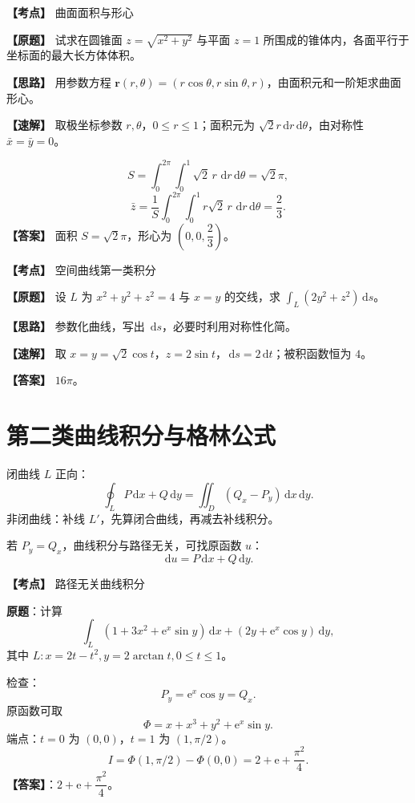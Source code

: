 ﻿\documentclass[11pt,a4paper,UTF8]{ctexart}
\newcommand{\dd}{\,\mathrm d}
\newcommand{\ee}{\mathrm e}
\begin{document}
\begin{answerbox}[2021--2022 四-13]
\textbf{【考点】} 曲面面积与形心

\textbf{【原题】} 试求在圆锥面 $z=\sqrt{x^2+y^2}$ 与平面 $z=1$ 所围成的锥体内，各面平行于坐标面的最大长方体体积。

\textbf{【思路】} 用参数方程 $\boldsymbol r(r,\theta)=(r\cos\theta,r\sin\theta,r)$，由面积元和一阶矩求曲面形心。

\textbf{【速解】} 取极坐标参数 $r,\theta$，$0\le r\le1$；面积元为 $\sqrt2r\dd r\dd\theta$，由对称性 $\bar x=\bar y=0$。

\[
S=\int_0^{2\pi}\int_0^1\sqrt2\,r\,\dd r\dd\theta=\sqrt2\pi,
\]
\[
\bar z=\frac{1}{S}\int_0^{2\pi}\int_0^1 r\sqrt2\,r\,\dd r\dd\theta=\frac23.
\]
\textbf{【答案】} 面积 $S=\sqrt2\pi$，形心为 $\left(0,0,\dfrac23\right)$。
\end{answerbox}

\begin{answerbox}[2021--2022 一-3]
\textbf{【考点】} 空间曲线第一类积分

\textbf{【原题】} 设 $L$ 为 $x^2+y^2+z^2=4$ 与 $x=y$ 的交线，求 $\displaystyle \int_L(2y^2+z^2)\dd s$。

\textbf{【思路】} 参数化曲线，写出 $\dd s$，必要时利用对称性化简。

\textbf{【速解】} 取 $x=y=\sqrt2\cos t$，$z=2\sin t$，$\dd s=2\dd t$；被积函数恒为 $4$。

\textbf{【答案】} $16\pi$。
\end{answerbox}
\section{第二类曲线积分与格林公式}

\begin{templatebox}[格林公式模板]
闭曲线 $L$ 正向：
\[
\oint_LP\dd x+Q\dd y=\iint_D\left(Q_x-P_y\right)\dd x\dd y.
\]
非闭曲线：补线 $L'$，先算闭合曲线，再减去补线积分。

若 $P_y=Q_x$，曲线积分与路径无关，可找原函数 $u$：
\[
\dd u=P\dd x+Q\dd y.
\]
\end{templatebox}

\begin{answerbox}[2020--2021 二-8]
\textbf{【考点】} 路径无关曲线积分

\textbf{原题}：计算
\[
\int_L(1+3x^2+\ee^x\sin y)\dd x+(2y+\ee^x\cos y)\dd y,
\]
其中 $L:x=2t-t^2,y=2\arctan t,0\le t\le1$。

检查：
\[
P_y=\ee^x\cos y=Q_x.
\]
原函数可取
\[
\Phi=x+x^3+y^2+\ee^x\sin y.
\]
端点：$t=0$ 为 $(0,0)$，$t=1$ 为 $(1,\pi/2)$。
\[
I=\Phi(1,\pi/2)-\Phi(0,0)=2+\ee+\frac{\pi^2}{4}.
\]
\textbf{【答案】}：$2+\ee+\dfrac{\pi^2}{4}$。
\end{answerbox}
\end{document}
